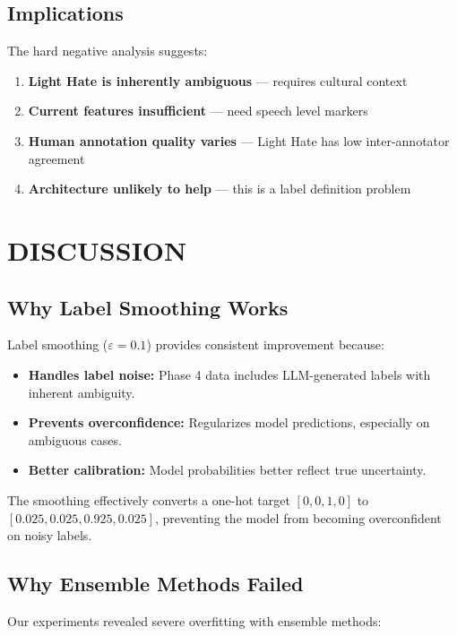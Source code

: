 \documentclass[10pt,journal]{IEEEtran}
\begin{document}
\subsection{Implications}

The hard negative analysis suggests:
\begin{enumerate}[leftmargin=*,noitemsep,topsep=0pt]
\item \textbf{Light Hate is inherently ambiguous} --- requires cultural context
\item \textbf{Current features insufficient} --- need speech level markers
\item \textbf{Human annotation quality varies} --- Light Hate has low inter-annotator agreement
\item \textbf{Architecture unlikely to help} --- this is a label definition problem
\end{enumerate}

\section{DISCUSSION}

\subsection{Why Label Smoothing Works}

Label smoothing ($\varepsilon=0.1$) provides consistent improvement because:

\begin{itemize}[leftmargin=*,noitemsep,topsep=0pt]
\item \textbf{Handles label noise:} Phase 4 data includes LLM-generated labels with inherent ambiguity.
\item \textbf{Prevents overconfidence:} Regularizes model predictions, especially on ambiguous cases.
\item \textbf{Better calibration:} Model probabilities better reflect true uncertainty.
\end{itemize}

The smoothing effectively converts a one-hot target $[0,0,1,0]$ to $[0.025, 0.025, 0.925, 0.025]$, preventing the model from becoming overconfident on noisy labels.

\subsection{Why Ensemble Methods Failed}

Our experiments revealed severe overfitting with ensemble methods:
\end{document}
